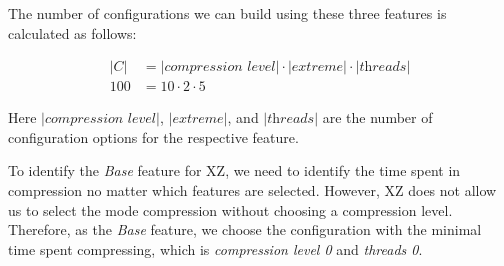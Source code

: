 
The number of configurations we can build using these three features is calculated as follows:

\begin{align}
    \lvert C \rvert &= \lvert \textit{compression level} \rvert \cdot \lvert \textit{extreme} \rvert \cdot \lvert \textit{threads} \rvert \\
    100 &= 10 \cdot 2 \cdot 5 \nonumber
\end{align}

Here $\lvert \textit{compression level} \rvert$, $\lvert \textit{extreme} \rvert$, and $\lvert \textit{threads} \rvert$ are the number of 
configuration options for the respective feature.

To identify the \emph{Base} feature for \textsc{XZ}, we need to identify the time spent in compression no matter which features are selected. 
However, \textsc{XZ} does not allow us to select the mode compression without choosing a compression level. 
Therefore, as the \emph{Base} feature, we choose the configuration with the minimal time spent compressing, 
which is \emph{compression level 0} and \emph{threads 0}.